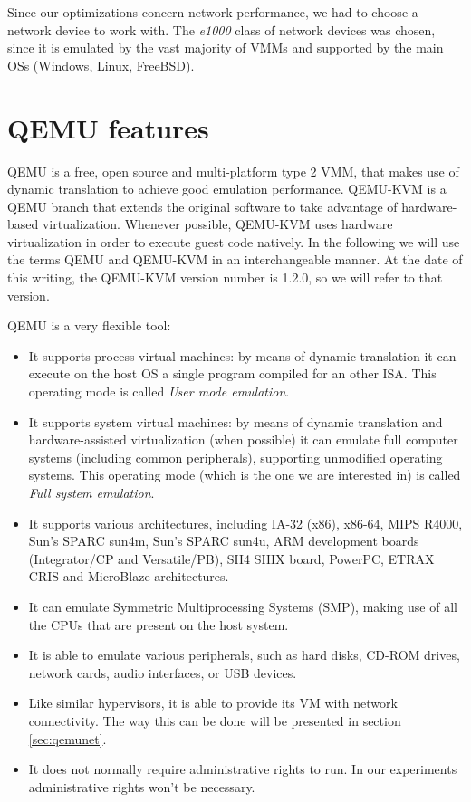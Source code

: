 \vspace{0.5cm}

Since our optimizations concern network performance, we had to choose a network device to work with. The \emph{e1000} class of 
network devices was chosen, since it is emulated by the vast majority of VMMs and supported by the main OSs (Windows, Linux, FreeBSD).


\section{QEMU features}
QEMU is a free, open source and multi-platform type 2 VMM, that makes use of dynamic translation to achieve good emulation performance.
QEMU-KVM is a QEMU branch that extends the original software to take advantage of hardware-based virtualization.
Whenever possible, QEMU-KVM uses hardware virtualization in order to execute guest code natively.
In the following we will use the terms QEMU and QEMU-KVM in an interchangeable manner.
At the date of this writing, the QEMU-KVM version number is 1.2.0, so we will refer to that version.

QEMU is a very flexible tool:
\begin{itemize}
    \item It supports process virtual machines: by means of dynamic translation it can execute on the host OS a single program compiled 
	  for an other ISA. This operating mode is called \emph{User mode emulation}.
	  
    \item It supports system virtual machines: by means of dynamic translation and hardware-assisted virtualization (when possible) it
	  can emulate full computer systems (including common peripherals), supporting unmodified operating systems. This operating
	  mode (which is the one we are interested in) is called \emph{Full system emulation}.
	  
    \item It supports various architectures, including  IA-32 (x86), x86-64, MIPS R4000, Sun's SPARC sun4m, Sun's SPARC sun4u,
	  ARM development boards (Integrator/CP and Versatile/PB), SH4 SHIX board, PowerPC,
	  ETRAX CRIS and MicroBlaze architectures.
	  
    \item It can emulate Symmetric Multiprocessing Systems (SMP), making use of all the CPUs that are present on the 
	  host system.
	  
    \item It is able to emulate various peripherals, such as hard disks, CD-ROM drives, network cards, audio interfaces, 
	  or USB devices.
	  
    \item Like similar hypervisors, it is able to provide its VM with network connectivity. The way this can be done will be
	  presented in section \ref{sec:qemunet}.
	  
    \item It does not normally require administrative rights to run. In our experiments administrative rights won't be
	  necessary.
\end{itemize}

